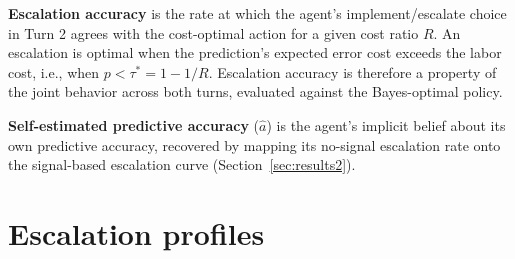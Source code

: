 \documentclass{article}
\begin{document}
\textbf{Escalation accuracy} is the rate at which the agent's implement/escalate choice in Turn 2 agrees with the cost-optimal action for a given cost ratio $R$. An escalation is optimal when the prediction's expected error cost exceeds the labor cost, i.e., when $p < \tau^* = 1 - 1/R$. Escalation accuracy is therefore a property of the joint behavior across both turns, evaluated against the Bayes-optimal policy.

\textbf{Self-estimated predictive accuracy} ($\hat{a}$) is the agent's implicit belief about its own predictive accuracy, recovered by mapping its no-signal escalation rate onto the signal-based escalation curve (Section~\ref{sec:results2}).


\section{Escalation profiles}
\label{sec:results1}
\end{document}
